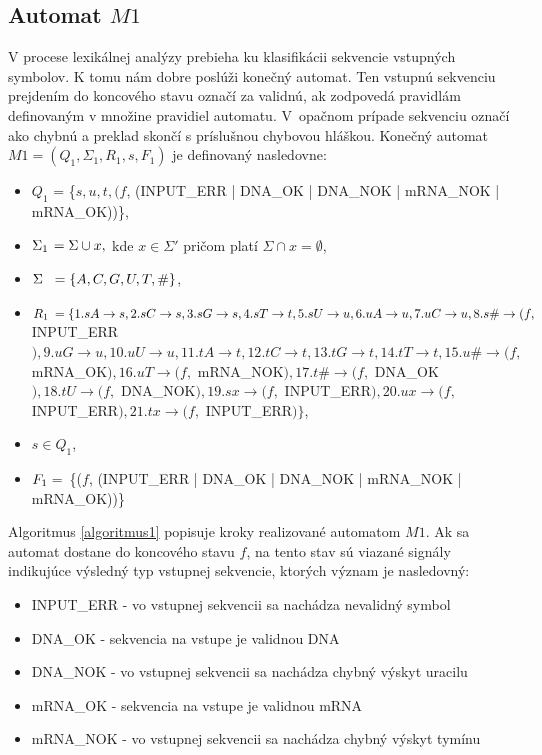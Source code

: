 \subsection{Automat $M1$}
V procese lexikálnej analýzy prebieha ku klasifikácii sekvencie vstupných symbolov. K tomu nám dobre poslúži konečný automat. Ten vstupnú sekvenciu prejdením do koncového stavu  označí za validnú, ak zodpovedá pravidlám definovaným v množine pravidiel automatu. V~opačnom prípade sekvenciu označí ako chybnú a preklad skončí s príslušnou chybovou hláškou. Konečný automat $M1 = (Q_1, \Sigma_1, R_1, s, F_1)$ je definovaný nasledovne:
\begin{itemize}
\item $Q_1$ = \{$s, u, t, (f$, (INPUT\_ERR | DNA\_OK | DNA\_NOK | mRNA\_NOK | mRNA\_OK))\},
\item $\Sigma_1 \hspace{0.4mm}= \Sigma \cup x,$ kde $x \in \Sigma'$ pričom platí $\Sigma \cap x = \emptyset $,
\item $\Sigma \hspace{2mm}= \{A, C, G, U, T, \#\}$,
\item $R_1 \hspace{0.8mm} = \{ 1.sA \to s, 2.sC \to s, 3.sG \to s, 4.sT \to t, 5.sU \to u, 6.uA \to u, 7.uC \to u, 8.s\# \to (f, $ INPUT\_ERR$), 9.uG \to u, 10.uU \to u, 11.tA \to t, 12.tC \to t, 13.tG \to t, 14.tT \to t, 15.u\# \to (f, $ mRNA\_OK$), 16.uT \to (f, $ mRNA\_NOK$), 17.t\# \to (f, $ DNA\_OK$), 18.tU \to (f, $ DNA\_NOK$), 19.sx \to (f, $ INPUT\_ERR$), 20.ux \to (f, $ INPUT\_ERR$), 21.tx \to (f, $ INPUT\_ERR$)\}$,
\item $s \in Q_1$,
\item $F_1 \hspace{0.8mm}$=~\{($f$, (INPUT\_ERR | DNA\_OK | DNA\_NOK | mRNA\_NOK | mRNA\_OK))\}
\end{itemize} 
Algoritmus \ref{algoritmus1} popisuje kroky realizované automatom $M1$. Ak sa automat dostane do koncového stavu $f$, na tento stav sú viazané signály indikujúce výsledný typ vstupnej sekvencie, ktorých význam je nasledovný:
\begin{itemize}
\item INPUT\_ERR - vo vstupnej sekvencii sa nachádza nevalidný symbol 
\item DNA\_OK - sekvencia na vstupe je validnou DNA
\item DNA\_NOK - vo vstupnej sekvencii sa nachádza chybný výskyt uracilu
\item mRNA\_OK - sekvencia na vstupe je validnou mRNA
\item mRNA\_NOK - vo vstupnej sekvencii sa nachádza chybný výskyt tymínu
\end{itemize} 
